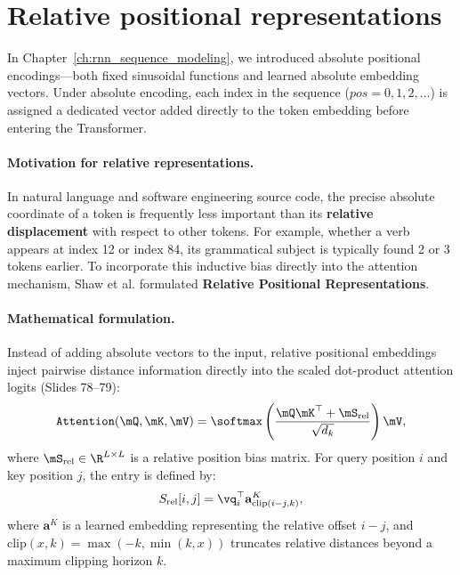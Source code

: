 \documentclass[../../main.tex]{subfiles}
\begin{document}
\section{Relative positional representations}
\label{sec:relative_positional_embeddings}

In Chapter~\ref{ch:rnn_sequence_modeling}, we introduced absolute positional encodings—both fixed sinusoidal functions \cite{vaswani2017} and learned absolute embedding vectors. Under absolute encoding, each index in the sequence ($pos = 0, 1, 2, \dots$) is assigned a dedicated vector added directly to the token embedding before entering the Transformer.

\paragraph{Motivation for relative representations.}
In natural language and software engineering source code, the precise absolute coordinate of a token is frequently less important than its \textbf{relative displacement} with respect to other tokens. For example, whether a verb appears at index 12 or index 84, its grammatical subject is typically found 2 or 3 tokens earlier.
To incorporate this inductive bias directly into the attention mechanism, Shaw et al. \cite{shaw2018} formulated \textbf{Relative Positional Representations}.

\paragraph{Mathematical formulation.}
Instead of adding absolute vectors to the input, relative positional embeddings inject pairwise distance information directly into the scaled dot-product attention logits (Slides 78--79):
\begin{equation}
\label{eq:relative_position_attention}
\text{\texttt{Attention}}(\mQ, \mK, \mV) = \softmax\left( \frac{\mQ \mK^\top + \mS_{\text{rel}}}{\sqrt{d_k}} \right) \mV,
\end{equation}
where $\mS_{\text{rel}} \in \R^{L \times L}$ is a relative position bias matrix. For query position $i$ and key position $j$, the entry is defined by:
\begin{equation}
S_{\text{rel}}[i, j] = \vq_i^\top \mathbf{a}_{\text{clip}(i - j, k)}^K,
\end{equation}
where $\mathbf{a}^K$ is a learned embedding representing the relative offset $i - j$, and $\text{clip}(x, k) = \max(-k, \min(k, x))$ truncates relative distances beyond a maximum clipping horizon $k$.
\end{document}
